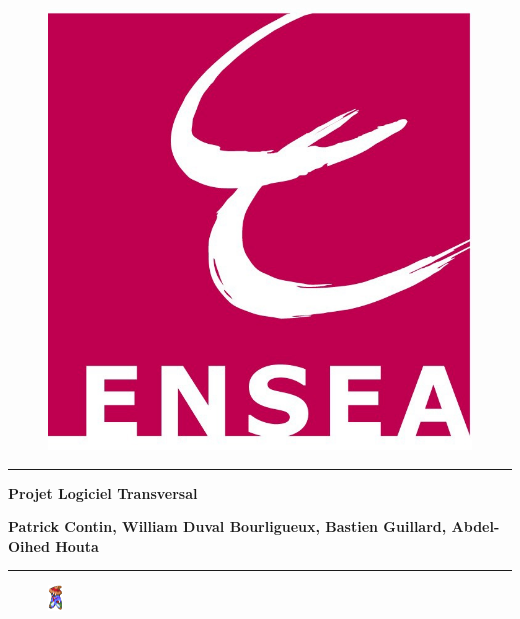\documentclass[a4paper,12pt]{article}
\newcommand{\HRule}{\rule{\linewidth}{0.5mm}}
\begin{document}
\thispagestyle{empty}

\begin{titlepage}

\begin{figure}[h]
\begin{center}
\includegraphics[scale=1.2]{Logo_ENSEA_couleur.jpg}
\end{center}
\end{figure}

\vspace*{2.5cm}
\HRule
\vspace{0.5cm}
\begin{center}\textbf{\Huge Projet Logiciel Transversal}\end{center}{\Large \par}

\begin{center}\textbf{\large Patrick Contin, William Duval Bourligueux, Bastien Guillard, Abdel-Oihed Houta}\end{center}{\large \par}

\HRule
\vspace{2cm}

\begin{figure}[h]
\begin{center}
\includegraphics[scale=2.8]{mage.png}
\end{center}
\end{figure}


\clearpage

{\small
\tableofcontents
}

\end{titlepage}
\end{document}
